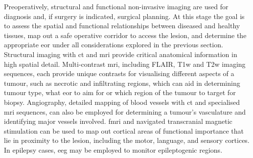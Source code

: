 Preoperatively, structural and functional non-invasive imaging are used for diagnosis and, if surgery is indicated, surgical planning.
At this stage the goal is to assess the spatial and functional relationships between diseased and healthy tissues, map out a safe operative corridor to access the lesion, and determine the appropriate \gls{eor} under all considerations explored in the previous section.
Structural imaging with \gls{ct} and \gls{mri} provide critical anatomical information in high spatial detail.
Multi-contrast \gls{mri}, including FLAIR, T1w and T2w imaging sequences, each provide unique contrasts for visualising different aspects of a tumour, such as necrotic and infiltrating regions, which can aid in determining tumour type, what \gls{eor} to aim for or which region of the tumour to target for biopsy.
Angiography, detailed mapping of blood vessels with \gls{ct} and specialised \gls{mri} sequences, can also be employed for determining a tumour's vasculature and identifying major vessels involved\autocite{Kashimura2008,Kim2019}.
\Gls{fmri} and navigated transcranial magnetic stimulation \autocite{WeissLucas2020} can be used to map out cortical areas of functional importance that lie in proximity to the lesion, including the motor, language, and sensory cortices.
In epilepsy cases, \gls{eeg} may be employed to monitor epileptogenic regions\autocite{Sarco2006}.

